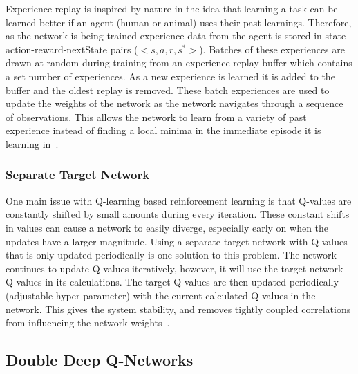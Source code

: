 \documentclass[12pt,american]{report}
\begin{document}
Experience replay is inspired by nature in the idea that learning a task can be learned better if an agent (human or animal) uses their past learnings.  Therefore, as the network is being trained experience data from the agent is stored in state-action-reward-nextState pairs ($<s,a,r,s^{*}>$). Batches of these experiences are drawn at random during training from an experience replay buffer which contains a set number of experiences.  As a new experience is learned it is added to the buffer and the oldest replay is removed. These batch experiences are used to update the weights of the network as the network navigates through a sequence of observations.  This allows the network to learn from a variety of past experience instead of finding a local minima in the immediate episode it is learning in~\cite{atari}.

\subsubsection{Separate Target Network}

One main issue with Q-learning based reinforcement learning is that Q-values are constantly shifted by small amounts during every iteration.  These constant shifts in values can cause a network to easily diverge, especially early on when the updates have a larger magnitude.  Using a separate target network with Q values that is only updated periodically is one solution to this problem.  The network continues to update Q-values iteratively, however, it will use the target network Q-values in its calculations.  The target Q values are then updated periodically (adjustable hyper-parameter) with the current calculated Q-values in the network.  This gives the system stability, and removes tightly coupled correlations from influencing the network weights~\cite{atari}.


\subsection{Double Deep Q-Networks}
\end{document}
